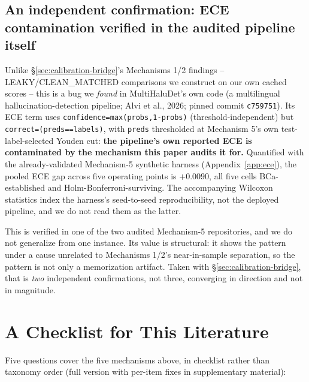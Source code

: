 \documentclass{article}
\begin{document}
\subsection{An independent confirmation: ECE contamination verified in the audited pipeline itself}
\label{sec:mechanism5-ece}

Unlike \S\ref{sec:calibration-bridge}'s Mechanisms 1/2 findings --
LEAKY/CLEAN\_MATCHED comparisons we construct on our own cached scores -- this
is a bug we \emph{found} in MultiHaluDet's own code (a multilingual
hallucination-detection pipeline; Alvi et al., 2026; pinned commit
\texttt{c759751}). Its ECE term uses
\texttt{confidence=max(probs,1-probs)} (threshold-independent) but
\texttt{correct=(preds==labels)}, with \texttt{preds} thresholded at Mechanism
5's own test-label-selected Youden cut: \textbf{the pipeline's own reported ECE
is contaminated by the mechanism this paper audits it for.} Quantified with the
already-validated Mechanism-5 synthetic harness (Appendix~\ref{app:ece}), the
pooled ECE gap across five operating points is $+0.0090$, all five cells
BCa-established and Holm-Bonferroni-surviving. The accompanying Wilcoxon
statistics index the harness's seed-to-seed reproducibility, not the deployed
pipeline, and we do not read them as the latter.

This is verified in one of the two audited Mechanism-5 repositories, and we do
not generalize from one instance. Its value is structural: it shows the pattern
under a cause unrelated to Mechanisms 1/2's near-in-sample separation, so the
pattern is not only a memorization artifact. Taken with
\S\ref{sec:calibration-bridge}, that is \emph{two} independent confirmations,
not three, converging in direction and not in magnitude.

\section{A Checklist for This Literature}
\label{sec:checklist}

Five questions cover the five mechanisms above, in checklist rather than
taxonomy order (full version with per-item fixes in supplementary material):
\end{document}
